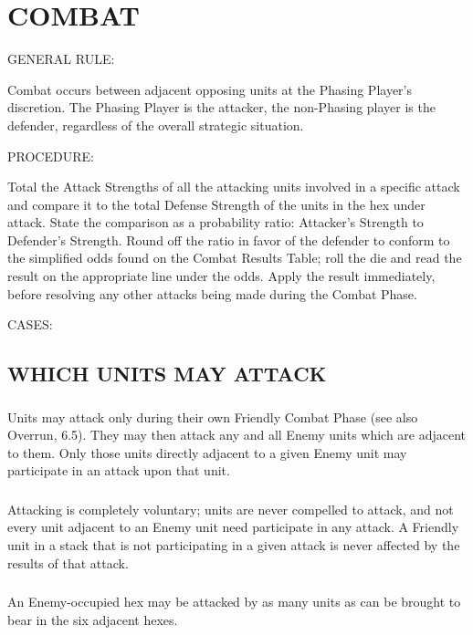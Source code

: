 \section{COMBAT}

GENERAL RULE:

Combat occurs between adjacent opposing units at the Phasing Player's discretion. The Phasing Player is the attacker, the non-Phasing player is the defender, regardless of the overall strategic situation.

PROCEDURE:

Total the Attack Strengths of all the attacking units involved in a specific attack and compare it to the total Defense Strength of the units in the hex under attack. State the comparison as a probability ratio: Attacker's Strength to Defender's Strength. Round off the ratio in favor of the defender to conform to the simplified odds found on the Combat Results Table; roll the die and read the result on the appropriate line under the odds. Apply the result immediately, before resolving any other attacks being made during the Combat Phase.

CASES:

\subsection{WHICH UNITS MAY ATTACK}

\subsubsection{} Units may attack only during their own Friendly Combat Phase (see also Overrun, 6.5). They may then attack any and all Enemy units which are adjacent to them. Only those units directly adjacent to a given Enemy unit may participate in an attack upon that unit.

\subsubsection{} Attacking is completely voluntary; units are never compelled to attack, and not every unit adjacent to an Enemy unit need participate in any attack. A Friendly unit in a stack that is not participating in a given attack is never affected by the results of that attack.

\subsubsection{} An Enemy-occupied hex may be attacked by as many units as can be brought to bear in the six adjacent hexes.

